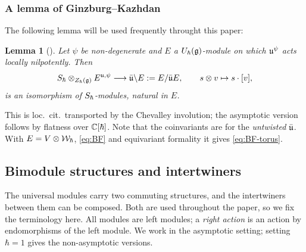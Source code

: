\documentclass{article}
\theoremstyle{plain}
\newtheorem{lemma}[theorem]{Lemma}
\theoremstyle{definition}
\theoremstyle{remark}
\numberwithin{equation}{section}
\begin{document}
\subsubsection{A lemma of Ginzburg--Kazhdan}\label{sec:GK}

The following lemma will be used frequently throught this paper:
\begin{lemma}[{\cite[Lemma 6.2.1]{ginzburg2022differentialoperatorsgugelfandgraev}}]\label{lem:GK}
Let $\psi$ be non-degenerate and $E$ a $U_\hbar(\mathfrak{g})$-module on which $\mathfrak{u}^\psi$ acts locally nilpotently. Then
\[
S_\hbar\otimes_{Z_\hbar(\mathfrak{g})}E^{\mathfrak{u},\psi}\longrightarrow\bar{\mathfrak{u}}\backslash E:=E/\bar{\mathfrak{u}} E,\qquad s\otimes v\mapsto s\cdot[v],
\]
is an isomorphism of $S_\hbar$-modules, natural in $E$.
\end{lemma}

This is loc.\ cit.\ transported by the Chevalley involution; the asymptotic version follows by flatness over $\mathbb{C}[\hbar]$. Note that the coinvariants are for the \emph{untwisted} $\bar{\mathfrak{u}}$. With $E=V\otimes\mathcal{W}_\hbar$, \eqref{eq:BF} and equivariant formality it gives \eqref{eq:BF-torus}.

\subsection{Bimodule structures and intertwiners}\label{sec:bimodules}
The universal modules carry two commuting structures, and the intertwiners between them can be composed. Both are used throughout the paper, so we fix the terminology here. All modules are left modules; a \emph{right action} is an action by endomorphisms of the left module. We work in the asymptotic setting; setting $\hbar=1$ gives the non-asymptotic versions.
\end{document}
